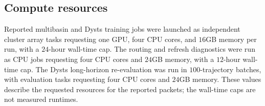 \subsection{Compute resources}
Reported multibasin and Dysts training jobs were launched as independent cluster array tasks requesting one GPU, four CPU cores, and $16$GB memory per run, with a $24$-hour wall-time cap. The routing and refresh diagnostics were run as CPU jobs requesting four CPU cores and $24$GB memory, with a $12$-hour wall-time cap. The Dysts long-horizon re-evaluation was run in $100$-trajectory batches, with evaluation tasks requesting four CPU cores and $24$GB memory. These values describe the requested resources for the reported packets; the wall-time caps are not measured runtimes.
